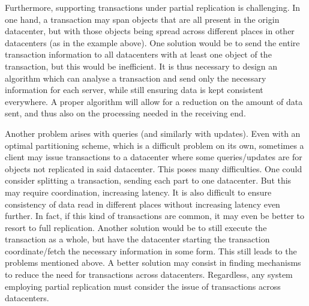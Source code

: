 Furthermore, supporting transactions under partial replication is challenging.
In one hand, a transaction may span objects that are all present in the origin datacenter, but with those objects being spread across different places in other datacenters (as in the example above).
One solution would be to send the entire transaction information to all datacenters with at least one object of the transaction, but this would be inefficient.
It is thus necessary to design an algorithm which can analyse a transaction and send only the necessary information for each server, while still ensuring data is kept consistent everywhere.
A proper algorithm will allow for a reduction on the amount of data sent, and thus also on the processing needed in the receiving end.

Another problem arises with queries (and similarly with updates).
Even with an optimal partitioning scheme, which is a difficult problem on its own, sometimes a client may issue transactions to a datacenter where some queries/updates are for objects not replicated in said datacenter.
This poses many difficulties.
One could consider splitting a transaction, sending each part to one datacenter.
But this may require coordination, increasing latency. 
It is also difficult to ensure consistency of data read in different places without increasing latency even further.
In fact, if this kind of transactions are common, it may even be better to resort to full replication.
Another solution would be to still execute the transaction as a whole, but have the datacenter starting the transaction coordinate/fetch the necessary information in some form.
This still leads to the problems mentioned above.
A better solution may consist in finding mechanisms to reduce the need for transactions across datacenters.
Regardless, any system employing partial replication must consider the issue of transactions across datacenters.

